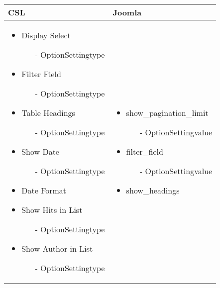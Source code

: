 \begin{minipage}{0.6\textwidth}
\begin{tabular}{|p{} | p{}|}
\hline
\textbf{CSL} & \textbf{Joomla} \\ 
\hline
\begin{itemize}
	\item Display Select
		\begin{enumerate}
			\item[-] OptionSettingtype
		\end{enumerate}
	\item Filter Field
		\begin{enumerate}
			\item[-] OptionSettingtype
		\end{enumerate} 
	\item Table Headings
		\begin{enumerate}
			\item[-] OptionSettingtype
		\end{enumerate}
	\item Show Date 
		\begin{enumerate}
			\item[-] OptionSettingtype
		\end{enumerate} 
	\item Date Format 
	\item Show Hits in List
		\begin{enumerate}
			\item[-] OptionSettingtype
		\end{enumerate} 
	\item Show Author in List
		\begin{enumerate}
			\item[-] OptionSettingtype
		\end{enumerate} 
\end{itemize}
 & 
\begin{itemize}
	\item show\_pagination\_limit
		\begin{enumerate}
			\item[-] OptionSettingvalue
		\end{enumerate}
	\item filter\_field
		\begin{enumerate}
			\item[-] OptionSettingvalue
		\end{enumerate} 
	\item show\_headings
		\begin{enumerate}

\end{enumerate}
\end{itemize}
\end{tabular}
\end{minipage}
